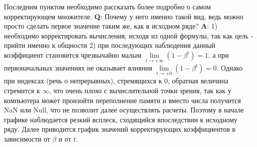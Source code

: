 			Последним пунктом необходимо рассказать более подробно о самом корректирующем множителе. \textbf{Q}: Почему у него именно такой вид, ведь можно просто сделать первое значение таким же, как в исходном ряде? \textbf{A}: 1) необходимо корректировать вычисления, исходя из одной формулы, так как цель - прийти именно к общности 2) при последующих наблюдения данный коэффициент становится чрезвычайно малым $\lim\limits_{t \to +\infty}(1 - \beta^t) = 1$, а при первоначальных значениях не оказывает влияния $\lim\limits_{t \to +0}(1 - \beta^t) = 0$. Однако при индексах (речь о непрерывных), стремящихся к $0$, обратная величина стремится к $\infty$, что очень плохо с вычислительной точки зрения, так как у компьютера может произойти переполнение памяти и вместо числа получится NaN или Null, что не позволит далее осуществлять расчеты. Поэтому в начале графике наблюдается резкий всплеск, сходящийся впоследствии к исходному ряду. Далее приводится график значений корректирующих коэффициентов в зависимости от $\beta$ и от $t$.
